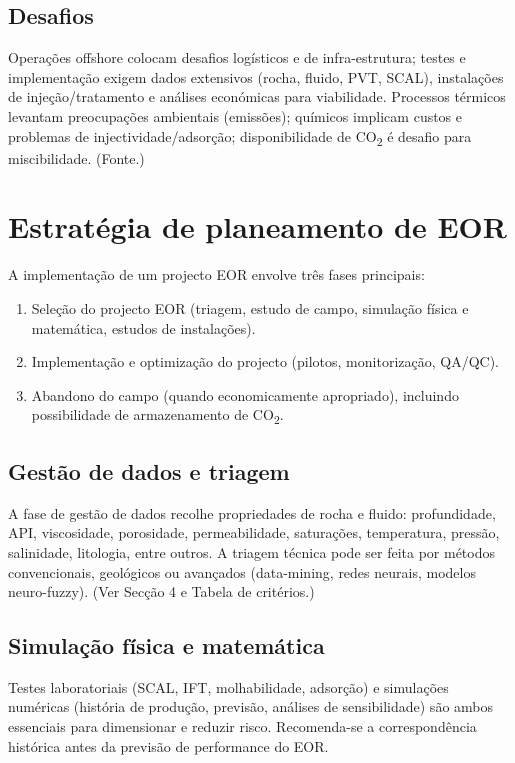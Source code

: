 \documentclass[11pt,a4paper]{article}
\begin{document}
\subsection{Desafios}
Operações offshore colocam desafios logísticos e de infra-estrutura; testes e implementação exigem dados extensivos (rocha, fluido, PVT, SCAL), instalações de injeção/tratamento e análises económicas para viabilidade. Processos térmicos levantam preocupações ambientais (emissões); químicos implicam custos e problemas de injectividade/adsorção; disponibilidade de CO\textsubscript{2} é desafio para miscibilidade. (Fonte.)

\section{Estratégia de planeamento de EOR}
A implementação de um projecto EOR envolve três fases principais:
\begin{enumerate}
	\item Seleção do projecto EOR (triagem, estudo de campo, simulação física e matemática, estudos de instalações).
	\item Implementação e optimização do projecto (pilotos, monitorização, QA/QC).
	\item Abandono do campo (quando economicamente apropriado), incluindo possibilidade de armazenamento de CO\textsubscript{2}.
\end{enumerate}

\subsection{Gestão de dados e triagem}
A fase de gestão de dados recolhe propriedades de rocha e fluido: profundidade, API, viscosidade, porosidade, permeabilidade, saturações, temperatura, pressão, salinidade, litologia, entre outros. A triagem técnica pode ser feita por métodos convencionais, geológicos ou avançados (data-mining, redes neurais, modelos neuro-fuzzy). (Ver Secção 4 e Tabela de critérios.)

\subsection{Simulação física e matemática}
Testes laboratoriais (SCAL, IFT, molhabilidade, adsorção) e simulações numéricas (história de produção, previsão, análises de sensibilidade) são ambos essenciais para dimensionar e reduzir risco. Recomenda-se a correspondência histórica antes da previsão de performance do EOR.
\end{document}
